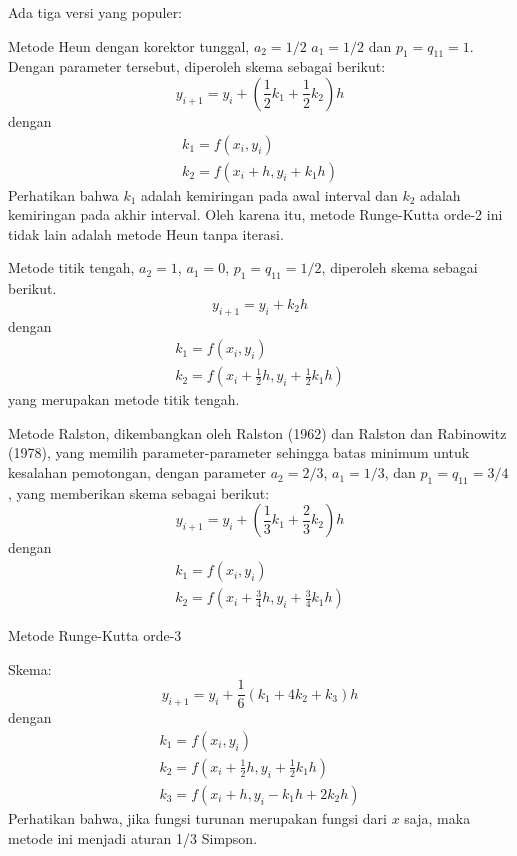 Ada tiga versi yang populer:

Metode Heun dengan korektor tunggal, $a_2 = 1/2$
$a_1 = 1/2$ dan $p_1 = q_{11} = 1$. Dengan parameter tersebut, diperoleh skema
sebagai berikut:
\begin{equation*}
y_{i+1} = y_{i} + \left(
\frac{1}{2}k_1 + \frac{1}{2}k_2
\right)h
\end{equation*}
dengan
\begin{align*}
k_1 = f(x_i, y_i) \\
k_2 = f(x_i + h, y_i + k_1 h)
\end{align*}
Perhatikan bahwa $k_1$ adalah kemiringan pada awal interval dan $k_2$ adalah
kemiringan pada akhir interval. Oleh karena itu, metode Runge-Kutta orde-2 ini
tidak lain adalah metode Heun tanpa iterasi.


Metode titik tengah, $a_2 = 1$, $a_1 = 0$, $p_1 = q_{11} = 1/2$, diperoleh
skema sebagai berikut.
\begin{equation*}
y_{i+1} = y_i + k_2 h
\end{equation*}
dengan
\begin{align*}
k_1 = f(x_i, y_i) \\
k_2 = f\left( x_i + \frac{1}{2}h, y_i + \frac{1}{2} k_1 h \right)
\end{align*}
yang merupakan metode titik tengah.

Metode Ralston, dikembangkan oleh Ralston (1962) dan Ralston dan Rabinowitz (1978),
yang memilih parameter-parameter sehingga batas minimum untuk kesalahan pemotongan,
dengan parameter $a_2 = 2/3$, $a_1 = 1/3$, dan $p_1 = q_{11} = 3/4$, yang
memberikan skema sebagai berikut:
\begin{equation*}
y_{i+1} = y_i + \left( \frac{1}{3}k_1 + \frac{2}{3}k_2 \right) h
\end{equation*}
dengan
\begin{align*}
k_1 = f(x_i, y_i) \\
k_2 = f\left( x_i + \frac{3}{4}h, y_i + \frac{3}{4}k_1 h \right)
\end{align*}


Metode Runge-Kutta orde-3

Skema:
\begin{equation*}
y_{i+1} = y_i + \frac{1}{6}(k_1 + 4k_2 + k_3)h
\end{equation*}
dengan
\begin{align*}
k_1 = f(x_i, y_i) \\
k_2 = f(x_i + \frac{1}{2}h, y_i + \frac{1}{2} k_1 h ) \\
k_3 = f(x_i + h, y_i - k_1 h + 2 k_2 h)
\end{align*}
Perhatikan bahwa, jika fungsi turunan merupakan fungsi dari $x$ saja, maka metode ini menjadi
aturan 1/3 Simpson.

